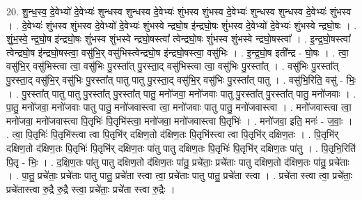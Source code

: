 \documentclass[17pt]{extarticle}
\begin{document}
20. शु॒न्ध॒स्व॒ दे॒वेभ्यो॑ दे॒वेभ्यः॑ शुन्धस्व शुन्धस्व दे॒वेभ्यः॑ शुंभस्व शुंभस्व दे॒वेभ्यः॑ शुन्धस्व शुन्धस्व दे॒वेभ्यः॑ शुंभस्व । . दे॒वेभ्यः॑ शुंभस्व शुंभस्व दे॒वेभ्यो॑ दे॒वेभ्यः॑ शुंभस्वे न्द्रघो॒ष इ॑न्द्रघो॒षः शुं॑भस्व दे॒वेभ्यो॑ दे॒वेभ्यः॑ शुंभस्वे न्द्रघो॒षः । . शुं॒भ॒स्वे॒ न्द्र॒घो॒ष इ॑न्द्रघो॒षः शुं॑भस्व शुंभस्वे न्द्रघो॒षस्त्वा᳚ त्वेन्द्रघो॒षः शुं॑भस्व शुंभस्वे न्द्रघो॒षस्त्वा᳚ । . इ॒न्द्र॒घो॒षस्त्वा᳚ त्वेन्द्रघो॒ष इ॑न्द्रघो॒षस्त्वा॒ वसु॑भि॒र् वसु॑भिस्त्वेन्द्रघो॒ष इ॑न्द्रघो॒षस्त्वा॒ वसु॑भिः । . इ॒न्द्र॒घो॒ष इती᳚न्द्र - घो॒षः । . त्वा॒ वसु॑भि॒र् वसु॑भिस्त्वा त्वा॒ वसु॑भिः पु॒रस्ता᳚त् पु॒रस्ता॒द् वसु॑भिस्त्वा त्वा॒ वसु॑भिः पु॒रस्ता᳚त् । . वसु॑भिः पु॒रस्ता᳚त् पु॒रस्ता॒द् वसु॑भि॒र् वसु॑भिः पु॒रस्ता᳚त् पातु पातु पु॒रस्ता॒द् वसु॑भि॒र् वसु॑भिः पु॒रस्ता᳚त् पातु । . वसु॑भि॒रिति॒ वसु॑ - भिः॒ । . पु॒रस्ता᳚त् पातु पातु पु॒रस्ता᳚त् पु॒रस्ता᳚त् पातु॒ मनो॑जवा॒ मनो॑जवाः पातु पु॒रस्ता᳚त् पु॒रस्ता᳚त् पातु॒ मनो॑जवाः । . पा॒तु॒ मनो॑जवा॒ मनो॑जवाः पातु पातु॒ मनो॑जवास्त्वा त्वा॒ मनो॑जवाः पातु पातु॒ मनो॑जवास्त्वा । . मनो॑जवास्त्वा त्वा॒ मनो॑जवा॒ मनो॑जवास्त्वा पि॒तृभिः॑ पि॒तृभि॑स्त्वा॒ मनो॑जवा॒ मनो॑जवास्त्वा पि॒तृभिः॑ । . मनो॑जवा॒ इति॒ मनः॑ - ज॒वाः॒ । . त्वा॒ पि॒तृभिः॑ पि॒तृभि॑स्त्वा त्वा पि॒तृभि॑र् दक्षिण॒तो द॑क्षिण॒तः पि॒तृभि॑स्त्वा त्वा पि॒तृभि॑र् दक्षिण॒तः । . पि॒तृभि॑र् दक्षिण॒तो द॑क्षिण॒तः पि॒तृभिः॑ पि॒तृभि॑र् दक्षिण॒तः पा॑तु पातु दक्षिण॒तः पि॒तृभिः॑ पि॒तृभि॑र् दक्षिण॒तः पा॑तु । . पि॒तृभि॒रिति॑ पि॒तृ - भिः॒ । . द॒क्षि॒ण॒तः पा॑तु पातु दक्षिण॒तो द॑क्षिण॒तः पा॑तु॒ प्रचे॑ताः॒ प्रचे॑ताः पातु दक्षिण॒तो द॑क्षिण॒तः पा॑तु॒ प्रचे॑ताः । . पा॒तु॒ प्रचे॑ताः॒ प्रचे॑ताः पातु पातु॒ प्रचे॑ता स्त्वा त्वा॒ प्रचे॑ताः पातु पातु॒ प्रचे॑ता स्त्वा । . प्रचे॑ता स्त्वा त्वा॒ प्रचे॑ताः॒ प्रचे॑तास्त्वा रु॒द्रै रु॒द्रै स्त्वा॒ प्रचे॑ताः॒ प्रचे॑ता स्त्वा रु॒द्रैः । \newline
\end{document}
